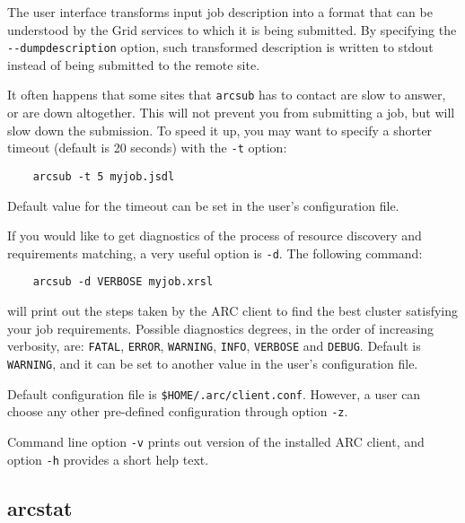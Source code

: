 The user interface transforms input job description into a format
that can be understood by the Grid services to which it is being
submitted. By specifying the \verb#--dumpdescription# option, such transformed
description is written to stdout instead of being submitted to the remote site.




It often happens that some sites that \verb#arcsub# has to contact
are slow to answer, or are down altogether. This will not prevent
you from submitting a job, but will slow down the submission. To
speed it up, you may want to specify a shorter timeout (default is
20 seconds) with the \verb#-t# option:
\begin{verbatim}
    arcsub -t 5 myjob.jsdl
\end{verbatim}

Default value for the timeout can be set in the user's configuration file.

If you would like to get diagnostics of the process of resource
discovery and requirements matching, a very useful option is
\verb#-d#. The following command:
\begin{verbatim}
    arcsub -d VERBOSE myjob.xrsl
\end{verbatim}

will print out the steps taken by the ARC client to find the
best cluster satisfying your job requirements. Possible diagnostics degrees, in the
order of increasing verbosity, are: \texttt{FATAL}, \texttt{ERROR}, \texttt{WARNING},
\texttt{INFO}, \texttt{VERBOSE} and \texttt{DEBUG}. Default is \texttt{WARNING}, and
it can be set to another value in the user's configuration file.

Default configuration file is \texttt{{\$}HOME/.arc/client.conf}. However, a user can choose any
other pre-defined configuration through option \verb#-z#.

Command line option \verb#-v# prints out version of the installed ARC client, and option
\verb#-h# provides a short help text.


\subsection{arcstat}
\label{sec:arcstat}

